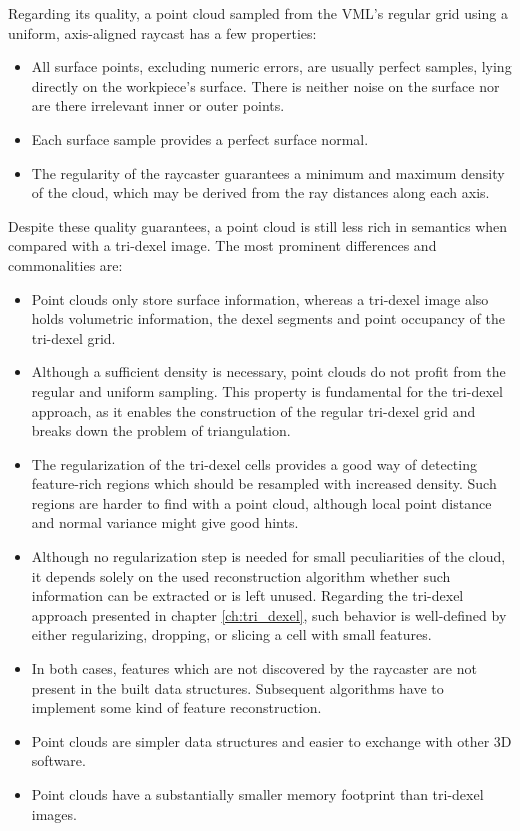 Regarding its quality, a point cloud sampled from the VML's regular grid using a uniform, axis-aligned raycast has a few properties:
\begin{itemize}
	\item
	All surface points, excluding numeric errors, are usually perfect samples, lying directly on the workpiece's surface.
	There is neither noise on the surface nor are there irrelevant inner or outer points.
	\item
	Each surface sample provides a perfect surface normal.
	\item
	The regularity of the raycaster guarantees a minimum and maximum density of the cloud, which may be derived from the ray distances along each axis.
\end{itemize}

Despite these quality guarantees, a point cloud is still less rich in semantics when compared with a tri-dexel image.
The most prominent differences and commonalities are:
\begin{itemize}
	\item
	Point clouds only store surface information, whereas a tri-dexel image also holds volumetric information, \ie the dexel segments and point occupancy of the tri-dexel grid.
	\item
	Although a sufficient density is necessary, point clouds do not profit from the regular and uniform sampling.
	This property is fundamental for the tri-dexel approach, as it enables the construction of the regular tri-dexel grid and breaks down the problem of triangulation.
	\item
	The regularization of the tri-dexel cells provides a good way of detecting feature-rich regions which should be resampled with increased density.
	Such regions are harder to find with a point cloud, although local point distance and normal variance might give good hints.
	\item
	Although no regularization step is needed for small peculiarities of the cloud, it depends solely on the used reconstruction algorithm whether such information can be extracted or is left unused.
	Regarding the tri-dexel approach presented in chapter \ref{ch:tri_dexel}, such behavior is well-defined by either regularizing, \ie dropping, or slicing a cell with small features.
	\item
	In both cases, features which are not discovered by the raycaster are not present in the built data structures.
	Subsequent algorithms have to implement some kind of feature reconstruction.
	\item
	Point clouds are simpler data structures and easier to exchange with other 3D software.
	\item
	Point clouds have a substantially smaller memory footprint than tri-dexel images.
\end{itemize}


